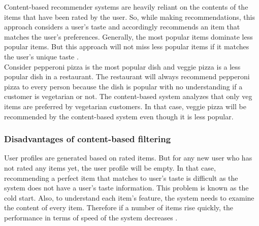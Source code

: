 Content-based recommender systems are heavily reliant on the contents of the items that have been rated by the user. So, while making recommendations, this approach considers a user's taste and accordingly recommends an item that matches the user's preferences. Generally, the most popular items dominate less popular items. But this approach will not miss less popular items if it matches the user's unique taste \cite{6}. \\
Consider pepperoni pizza is the most popular dish and veggie pizza is a less popular dish in a restaurant. The restaurant will always recommend pepperoni pizza to every person because the dish is popular with no understanding if a customer is vegetarian or not. The content-based system analyzes that only veg items are preferred by vegetarian customers. In that case, veggie pizza will be recommended by the content-based system even though it is less popular.
\\
\subsubsection{Disadvantages of content-based filtering}

User profiles are generated based on rated items. But for any new user who has not rated any items yet, the user profile will be empty. In that case, recommending a perfect item that matches to user’s taste is difficult as the system does not have a user's taste information. This problem is known as the cold start. Also, to understand each item's feature, the system needs to examine the content of every item. Therefore if a number of items rise quickly, the performance in terms of speed of the system decreases \cite{6}.\\

